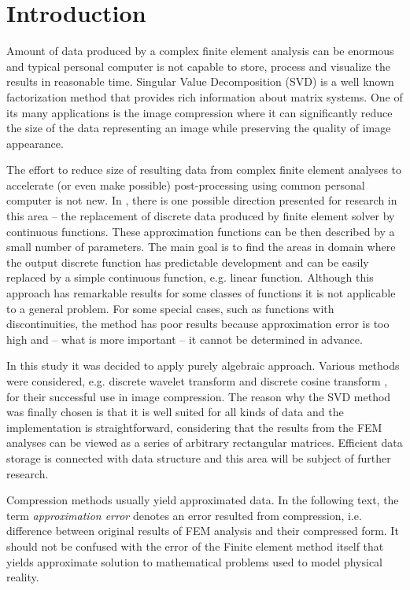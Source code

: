 \section{Introduction}
\label{sec:introduction}


Amount of data produced by a complex finite element analysis can be enormous and typical personal computer is not capable to store, process and visualize the results in reasonable time. Singular Value Decomposition (SVD) is a well known factorization method that provides rich information about matrix systems. One of its many applications is the image compression where it can significantly reduce the size of the data representing an image while preserving the quality of image appearance.

The effort to reduce size of resulting data from complex finite element analyses to accelerate (or even make possible) post-processing using common personal computer is not new. In \cite{Benes2016}, there is one possible direction presented for research in this area -- the replacement of discrete data produced by finite element solver by continuous functions. These approximation functions can be then described by a small number of parameters. The main goal is to find the areas in domain where the output discrete function has predictable development and can be easily replaced by a simple continuous function, e.g. linear function. Although this approach has remarkable results for some classes of functions it is not applicable to a general problem. For some special cases, such as functions with discontinuities, the method has poor results because approximation error is too high and -- what is more important -- it cannot be determined in advance.

In this study it was decided to apply purely algebraic approach. Various methods were considered, e.g. discrete wavelet transform \cite{Lui2001} and discrete cosine transform \cite{Watson1994}, for their successful use in image compression. The reason why the SVD method was finally chosen is that it is well suited for all kinds of data and the implementation is straightforward, considering that the results from the FEM analyses can be viewed as a series of arbitrary rectangular matrices. Efficient data storage is connected with data structure \cite{Ivanyi2012, Ivanyi2014} and this area will be subject of further research.

Compression methods usually yield approximated data. In the following text, the term \textit{approximation error} denotes an error resulted from compression, i.e. difference between original results of FEM analysis and their compressed form. It should not be confused with the error of the Finite element method itself that yields approximate solution to mathematical problems used to model physical reality.


